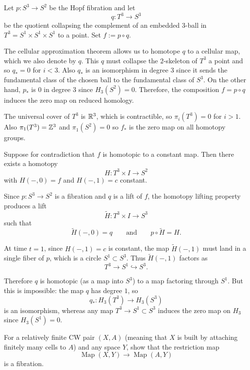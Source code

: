 \documentclass[12pt]{article}
\begin{document}
\begin{solution}
Let \(p:S^3\to S^2\) be the Hopf fibration and let
\[
q:T^3\to S^3
\]
be the quotient collapsing the complement of an embedded \(3\)-ball in \(T^3=S^1\times S^1\times S^1\) to a point. Set \(f:=p\circ q\).

The cellular approximation theorem allows us to homotope \(q\) to a cellular map, which we also denote by \(q\). This $q$ must collapse the \(2\)-skeleton of \(T^3\) a point and so $q_*=0$ for $i<3$. Also $q_*$ is an isomorphism in degree $3$ since it sends the fundamental class of the chosen ball to the fundamental class of $S^3$. On the other hand, $p_*$ is $0$ in degree $3$ since $H_3(S^2)=0$. Therefore, the composition \(f=p\circ q\) induces the zero map on reduced homology.

The universal cover of $T^3$ is $\mathbb{R}^3$, which is contractible, so $\pi_i(T^3)=0$ for $i>1$. Also $\pi_1(T^3)=\mathbb{Z}^3$ and $\pi_1(S^2) = 0$ so $f_*$ is the zero map on all homotopy groups.

Suppose for contradiction that \(f\) is homotopic to a constant map. Then there exists a homotopy
\[
H:T^3\times I\to S^2
\]
with \(H(-,0)=f\) and \(H(-,1)=c\) constant.

Since \(p:S^3\to S^2\) is a fibration and \(q\) is a lift of \(f\), the homotopy lifting property produces a lift
\[
\widetilde H:T^3\times I\to S^3
\]
such that
\[
\widetilde H(-,0)=q
\qquad\text{and}\qquad
p\circ \widetilde H = H.
\]

At time \(t=1\), since \(H(-,1)=c\) is constant, the map \(\widetilde H(-,1)\) must land in a single fiber of \(p\), which is a circle \(S^1\subset S^3\). Thus \(\widetilde H(-,1)\) factors as
\[
T^3 \longrightarrow S^1 \hookrightarrow S^3.
\]

Therefore \(q\) is homotopic (as a map into \(S^3\)) to a map factoring through \(S^1\). But this is impossible: the map \(q\) has degree \(1\), so
\[
q_*:H_3(T^3)\to H_3(S^3)
\]
is an isomorphism, whereas any map \(T^3\to S^1\subset S^3\) induces the zero map on \(H_3\) since \(H_3(S^1)=0\).
\end{solution}

\begin{problem}[3]
For a relatively finite CW pair \((X,A)\) (meaning that \(X\) is built by attaching finitely many cells to \(A\)) and any space \(Y\), show that the restriction map
\[
\operatorname{Map}(X,Y)\to \operatorname{Map}(A,Y)
\]
is a fibration.
\end{problem}
\end{document}

